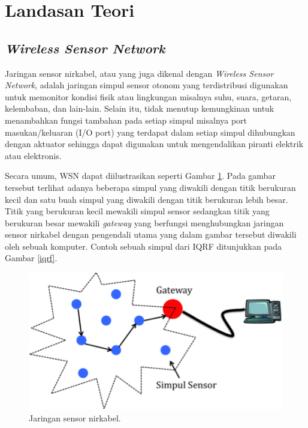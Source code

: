 \section{Landasan Teori}
  \subsection{\emph{Wireless Sensor Network}}
    Jaringan sensor nirkabel, atau yang juga dikenal dengan \emph{Wireless Sensor Network}, adalah jaringan simpul sensor otonom yang terdistribusi digunakan untuk memonitor kondisi fisik atau lingkungan misalnya suhu, suara, getaran, kelembaban, dan lain-lain. Selain itu, tidak menutup kemungkinan untuk menambahkan fungsi tambahan pada setiap simpul misalnya port masukan/keluaran (I/O port) yang terdapat dalam setiap simpul dihubungkan dengan aktuator sehingga dapat digunakan untuk mengendalikan piranti elektrik atau elektronis.

    Secara umum, WSN dapat diilustrasikan seperti Gambar \ref{wsn}. Pada gambar tersebut terlihat adanya beberapa simpul yang diwakili dengan titik berukuran kecil dan satu buah simpul yang diwakili dengan titik berukuran lebih besar. Titik yang berukuran kecil mewakili simpul sensor sedangkan titik yang berukuran besar mewakili \emph{gateway} yang berfungsi menghubungkan jaringan sensor nirkabel dengan pengendali utama yang dalam gambar tersebut diwakili oleh sebuah komputer. Contoh sebuah simpul dari IQRF ditunjukkan pada Gambar \ref{iqrf}.

      \begin{figure}[H]
        \centering
          \includegraphics{gambar/wsn}
          \caption{Jaringan sensor nirkabel.}
          \label{wsn}
      \end{figure}

